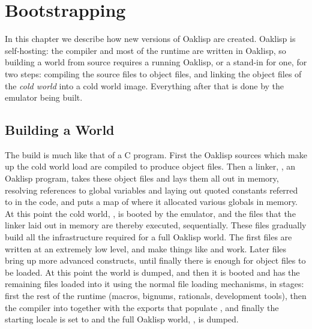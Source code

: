 %
%
%


\chapter{Bootstrapping} \label{sec:boot}

In this chapter we describe how new versions of Oaklisp are created.
Oaklisp is self-hosting: the compiler and most of the runtime are
written in Oaklisp, so building a world from source requires a
running Oaklisp, or a stand-in for one, for two steps: compiling the
 source files to  object files, and linking the
object files of the \emph{cold world} into a cold world image.
Everything after that is done by the emulator being built.

\section{Building a World}

The build is much like that of a C program.  First the Oaklisp
sources which make up the cold world load are compiled to produce
object files.  Then a linker, , an Oaklisp program,
takes these object files and lays them all out in memory, resolving
references to global variables and laying out quoted constants
referred to in the code, and puts a map of where it allocated various
globals in memory.  At this point the cold world, , is
booted by the emulator, and the files that the linker laid out in
memory are thereby executed, sequentially.  These files gradually
build all the infrastructure required for a full Oaklisp world.  The
first files are written at an extremely low level, and make things
like  and  work.  Later files bring up more
advanced constructs, until finally there is enough for object files
to be loaded.  At this point the world is dumped, and then it is
booted and has the remaining files loaded into it using the normal
file loading mechanisms, in stages: first the rest of the runtime
(macros, bignums, rationals, development tools), then the compiler
into  together with the exports that populate
, and finally the starting locale is set to
 and the full Oaklisp world, , is
dumped.

